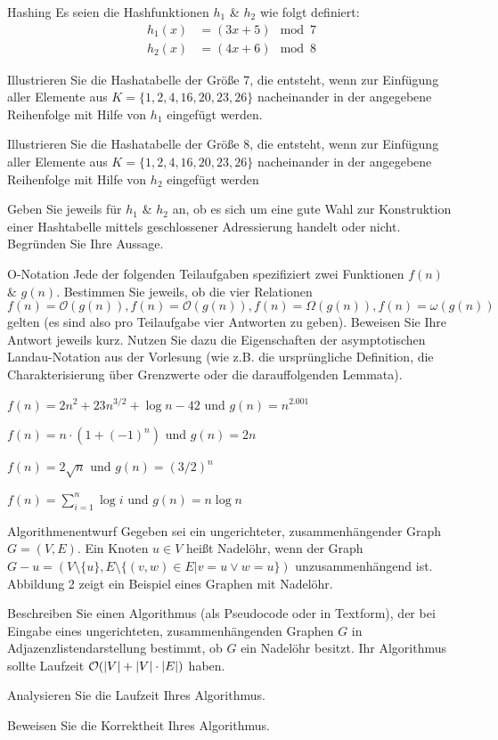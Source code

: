 \documentclass{exercisesheet}
\begin{document}
\setcounter{subsection}{2}
\begin{eexercises}{Hashing}{
    Es seien die Hashfunktionen $h_1$ \& $h_2$ wie folgt definiert:
    \begin{align*}
      h_1(x) & = (3x + 5) \mod 7 \\
      h_2(x) & = (4x + 6) \mod 8
    \end{align*}
  }
  \item Illustrieren Sie die Hashatabelle der Größe 7, die entsteht, wenn zur Einfügung aller Elemente aus $K = \{1, 2, 4, 16, 20, 23, 26\}$ nacheinander in der angegebene Reihenfolge mit Hilfe von $h_1$ eingefügt werden.
  \item Illustrieren Sie die Hashatabelle der Größe 8, die entsteht, wenn zur Einfügung aller Elemente aus $K = \{1, 2, 4, 16, 20, 23, 26\}$ nacheinander in der angegebene Reihenfolge mit Hilfe von $h_2$ eingefügt werden
  \item Geben Sie jeweils für $h_1$ \& $h_2$ an, ob es sich um eine gute Wahl zur Konstruktion einer Hashtabelle mittels geschlossener Adressierung handelt oder nicht. Begründen Sie Ihre Aussage.
\end{eexercises}

\begin{eexercises}{O-Notation}{
  Jede der folgenden Teilaufgaben spezifiziert zwei Funktionen $f(n)$ \& $g(n)$. Bestimmen Sie jeweils, ob die vier Relationen $f(n) = \mathcal{O}(g(n)), f(n) = \mathcal{O}(g(n)), f(n) = \Omega(g(n)), f(n) = \omega(g(n))$ gelten (es sind also pro Teilaufgabe vier Antworten zu geben). Beweisen Sie Ihre Antwort jeweils kurz. Nutzen Sie dazu die Eigenschaften der asymptotischen Landau-Notation aus der Vorlesung (wie z.B. die ursprüngliche Definition, die Charakterisierung über Grenzwerte oder die darauffolgenden Lemmata).
    }
    \item $f(n) = 2n^2 + 23n^{3/2} + \log{n} -42$ und $g(n) = n^{2.001}$
    \item $f(n) = n \cdot (1 + (-1)^n)$ und $g(n) = 2n$
    \item $f(n) = 2\sqrt{n}$ und $g(n) = (3/2)^n$
    \item $f(n) = \sum_{i=1}^n \log{i}$ und $g(n) = n \log{n}$
\end{eexercises}

\begin{eexercises}{Algorithmenentwurf}{
    Gegeben sei ein ungerichteter, zusammenhängender Graph $G = (V, E)$. Ein Knoten $u \in V$ heißt Nadelöhr, wenn der Graph $G - u = (V \setminus \{u\}, E \setminus \{(v, w) \in E | v = u \lor w = u\})$ unzusammenhängend ist. Abbildung 2 zeigt ein Beispiel eines Graphen mit Nadelöhr.
  }
  \item Beschreiben Sie einen Algorithmus (als Pseudocode oder in Textform), der bei Eingabe eines ungerichteten, zusammenhängenden Graphen $G$ in Adjazenzlistendarstellung bestimmt, ob $G$ ein Nadelöhr besitzt. Ihr Algorithmus sollte Laufzeit $\mathcal{O}(|V| + |V| \cdot |E|)$ haben.
  \item Analysieren Sie die Laufzeit Ihres Algorithmus.
  \item Beweisen Sie die Korrektheit Ihres Algorithmus.
\end{eexercises}
\end{document}

